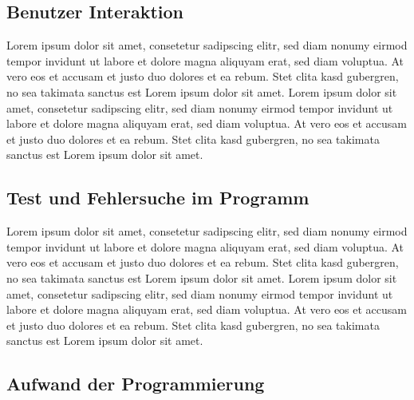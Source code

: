 \subsection{Benutzer Interaktion}
\label{user_interaktion_mit_hoerherer_schicht}

Lorem ipsum dolor sit amet, consetetur sadipscing elitr, sed diam nonumy eirmod tempor invidunt ut labore et dolore magna aliquyam erat, sed diam voluptua. At vero eos et accusam et justo duo dolores et ea rebum. Stet clita kasd gubergren, no sea takimata sanctus est Lorem ipsum dolor sit amet. Lorem ipsum dolor sit amet, consetetur sadipscing elitr, sed diam nonumy eirmod tempor invidunt ut labore et dolore magna aliquyam erat, sed diam voluptua. At vero eos et accusam et justo duo dolores et ea rebum. Stet clita kasd gubergren, no sea takimata sanctus est Lorem ipsum dolor sit amet.

\subsection{Test und Fehlersuche im Programm}
\label{debuggen_mit_hoeherer schicht}
Lorem ipsum dolor sit amet, consetetur sadipscing elitr, sed diam nonumy eirmod tempor invidunt ut labore et dolore magna aliquyam erat, sed diam voluptua. At vero eos et accusam et justo duo dolores et ea rebum. Stet clita kasd gubergren, no sea takimata sanctus est Lorem ipsum dolor sit amet. Lorem ipsum dolor sit amet, consetetur sadipscing elitr, sed diam nonumy eirmod tempor invidunt ut labore et dolore magna aliquyam erat, sed diam voluptua. At vero eos et accusam et justo duo dolores et ea rebum. Stet clita kasd gubergren, no sea takimata sanctus est Lorem ipsum dolor sit amet.

\subsection{Aufwand der Programmierung}
\label{eigene_api_aufwand}